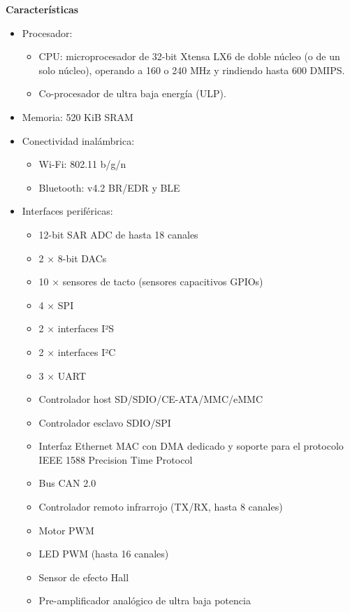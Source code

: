 \textbf{Características}
\begin{itemize}
    \item Procesador:
          \begin{itemize}
              \item CPU: microprocesador de 32-bit Xtensa LX6 de doble núcleo (o de un solo núcleo), operando a 160 o 240 MHz y rindiendo hasta 600 DMIPS.
              \item Co-procesador de ultra baja energía (ULP).
          \end{itemize}
    \item Memoria: 520 KiB SRAM
    \item Conectividad inalámbrica:
          \begin{itemize}
              \item Wi-Fi: 802.11 b/g/n
              \item Bluetooth: v4.2 BR/EDR y BLE
          \end{itemize}
    \item Interfaces periféricas:
          \begin{itemize}
              \item 12-bit SAR ADC de hasta 18 canales
              \item 2 × 8-bit DACs
              \item 10 × sensores de tacto (sensores capacitivos GPIOs)
              \item 4 × SPI
              \item 2 × interfaces I²S
              \item 2 × interfaces I²C
              \item 3 × UART
              \item Controlador host SD/SDIO/CE-ATA/MMC/eMMC
              \item Controlador esclavo SDIO/SPI
              \item Interfaz Ethernet MAC con DMA dedicado y soporte para el protocolo IEEE 1588 Precision Time Protocol
              \item Bus CAN 2.0
              \item Controlador remoto infrarrojo (TX/RX, hasta 8 canales)
              \item Motor PWM
              \item LED PWM (hasta 16 canales)
              \item Sensor de efecto Hall
              \item Pre-amplificador analógico de ultra baja potencia

\end{itemize}
\end{itemize}

